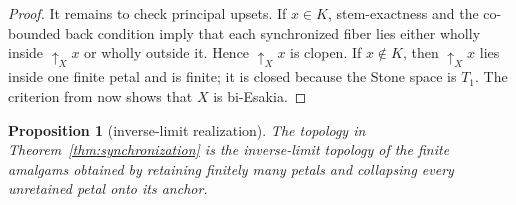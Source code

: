 \documentclass[11pt]{article}
\newtheorem{proposition}[theorem]{Proposition}
\theoremstyle{remark}
\numberwithin{equation}{section}
\begin{document}
\begin{proof}
It remains to check principal upsets. If $x\in K$, stem-exactness and the
co-bounded back condition imply that each synchronized fiber lies either
wholly inside $\uparrow_Xx$ or wholly outside it. Hence $\uparrow_Xx$ is
clopen. If $x\notin K$, then $\uparrow_Xx$ lies inside one finite petal and is
finite; it is closed because the Stone space is $T_1$. The criterion from
\cite[Theorem 2.12]{ref3} now shows that $X$ is bi-Esakia.
\end{proof}

\begin{proposition}[inverse-limit realization]\label{prop:inverse-limit}
The topology in Theorem~\ref{thm:synchronization} is the inverse-limit topology
of the finite amalgams obtained by retaining finitely many petals and
collapsing every unretained petal onto its anchor.
\end{proposition}
\end{document}
